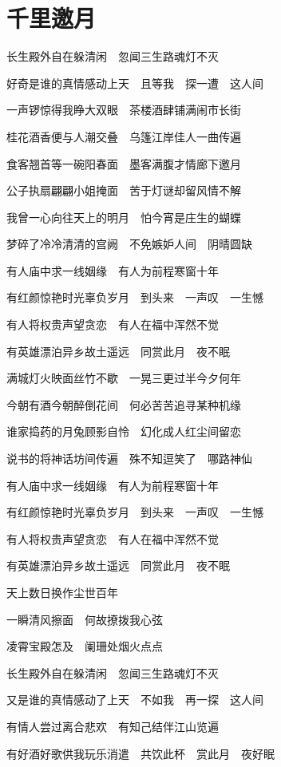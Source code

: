 \section{\texorpdfstring{\fontcn}{}千里邀月}
{\fontcn

长生殿外自在躲清闲　忽闻三生路魂灯不灭

好奇是谁的真情感动上天　且等我　探一遭　这人间

\bigskip

一声锣惊得我睁大双眼　茶楼酒肆铺满闹市长街

桂花酒香便与人潮交叠　乌篷江岸佳人一曲传遍

食客翘首等一碗阳春面　墨客满腹才情廊下邀月

公子执扇翩翩小姐掩面　苦于灯谜却留风情不解

\bigskip

我曾一心向往天上的明月　怕今宵是庄生的蝴蝶

梦碎了冷冷清清的宫阙　不免嫉妒人间　阴晴圆缺

\bigskip

有人庙中求一线姻缘　有人为前程寒窗十年

有红颜惊艳时光辜负岁月　到头来　一声叹　一生憾

有人将权贵声望贪恋　有人在福中浑然不觉

有英雄漂泊异乡故土遥远　同赏此月　夜不眠

\bigskip

满城灯火映面丝竹不歇　一晃三更过半今夕何年

今朝有酒今朝醉倒花间　何必苦苦追寻某种机缘

\bigskip

谁家捣药的月兔顾影自怜　幻化成人红尘间留恋

说书的将神话坊间传遍　殊不知逗笑了　哪路神仙

\bigskip

有人庙中求一线姻缘　有人为前程寒窗十年

有红颜惊艳时光辜负岁月　到头来　一声叹　一生憾

有人将权贵声望贪恋　有人在福中浑然不觉

有英雄漂泊异乡故土遥远　同赏此月　夜不眠

\bigskip

天上数日换作尘世百年

一瞬清风擦面　何故撩拨我心弦

凌霄宝殿怎及　阑珊处烟火点点

\bigskip

长生殿外自在躲清闲　忽闻三生路魂灯不灭

又是谁的真情感动了上天　不如我　再一探　这人间

有情人尝过离合悲欢　有知己结伴江山览遍

有好酒好歌供我玩乐消遣　共饮此杯　赏此月　夜好眠

}
